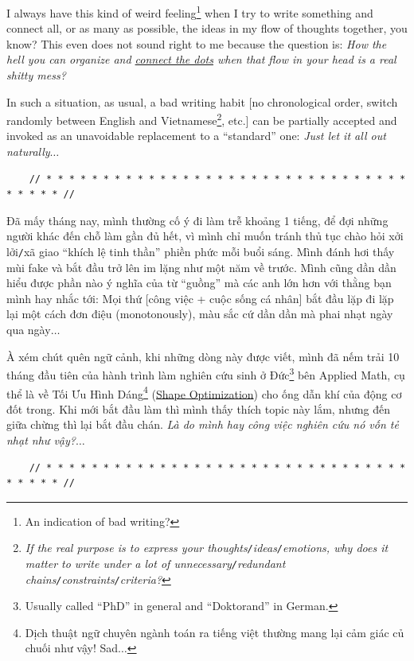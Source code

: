 \documentclass[12pt]{article}
\numberwithin{equation}{section}
\begin{document}
I always have this kind of weird feeling\footnote{An indication of bad writing?} when I try to write something and connect all, or as many as possible, the ideas in my flow of thoughts together, you know? This even does not sound right to me because the question is: \textit{How the hell you can organize and \href{https://en.wikipedia.org/wiki/Connect_the_dots}{connect the dots} when that flow in your head is a real shitty mess?}

In such a situation, as usual, a bad writing habit [no chronological order, switch randomly between English and Vietnamese\footnote{\textit{If the real purpose is to express your thoughts\texttt{/}ideas\texttt{/}emotions, why does it matter to write under a lot of unnecessary\texttt{/}redundant chains\texttt{/}constraints\texttt{/}criteria?}}, etc.] can be partially accepted and invoked as an unavoidable replacement to a ``standard'' one: \textit{Just let it all out naturally$\ldots$}

\begin{verbatim}
    // * * * * * * * * * * * * * * * * * * * * * * * * * * * * * * * * * * * * * //
\end{verbatim}

\noindent
{} Đã mấy tháng nay, mình thường cố ý đi làm trễ khoảng 1 tiếng, để đợi những người khác đến chỗ làm gần đủ hết, vì mình chỉ muốn tránh thủ tục chào hỏi xởi lởi\texttt{/}xã giao ``khích lệ tinh thần'' phiền phức mỗi buổi sáng. Mình đánh hơi thấy mùi fake và bắt đầu trở lên im lặng như một năm về trước. Mình cũng dần dần hiểu được phần nào ý nghĩa của từ ``guồng'' mà các anh lớn hơn với thằng bạn mình hay nhắc tới: Mọi thứ [công việc + cuộc sống cá nhân] bắt đầu lặp đi lặp lại một cách đơn điệu (monotonously), màu sắc cứ dần dần mà phai nhạt ngày qua ngày$\ldots$

À xém chút quên ngữ cảnh, khi những dòng này được viết, mình đã nếm trải 10 tháng đầu tiên của hành trình làm nghiên cứu sinh ở Đức\footnote{Usually called ``PhD'' in general and ``Doktorand'' in German.} bên Applied Math, cụ thể là về Tối Ưu Hình Dáng\footnote{Dịch thuật ngữ chuyên ngành toán ra tiếng việt thường mang lại cảm giác củ chuối như vậy! Sad$\ldots$} (\href{https://en.wikipedia.org/wiki/Shape_optimization}{Shape Optimization}) cho ống dẫn khí của động cơ đốt trong. Khi mới bắt đầu làm thì mình thấy thích topic này lắm, nhưng đến giữa chừng thì lại bắt đầu chán. \textit{Là do mình hay công việc nghiên cứu nó vốn tẻ nhạt như vậy?}$\ldots$

\begin{verbatim}
    // * * * * * * * * * * * * * * * * * * * * * * * * * * * * * * * * * * * * * //
\end{verbatim}
\end{document}

